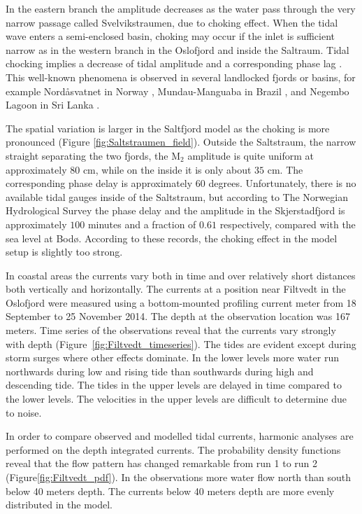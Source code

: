 In the eastern branch the amplitude decreases as the water pass through the very narrow passage called Svelvikstraumen, due to choking effect. 
When the tidal wave enters a semi-enclosed basin, choking may occur if the inlet is sufficient narrow as in the western branch in the Oslofjord and inside the Saltraum. Tidal chocking implies a decrease of tidal amplitude and a corresponding phase lag \cite[]{stigebrandt80}. This well-known phenomena is observed in several landlocked fjords or basins, for example Nord{\aa}svatnet in Norway \cite[]{glenne63}, Mundau-Manguaba in Brazil \cite[]{oliveira93}, and Negembo Lagoon in Sri Lanka \cite[]{rydberg96}. 

The spatial variation is larger in the Saltfjord model as the choking is more pronounced (Figure \ref{fig:Saltstraumen_field}). Outside the Saltstraum, the narrow straight separating the two fjords, the M$_2$ amplitude is quite uniform at approximately $80$ cm, while on the inside it is only about $35$ cm. The corresponding phase delay is approximately $60$ degrees. Unfortunately, there is no available tidal gauges inside of the Saltstraum, but according to The Norwegian Hydrological Survey the phase delay and the amplitude in the Skjerstadfjord is approximately $100$ minutes and a fraction of $0.61$ respectively, compared with the sea level at Bod{\o}.
According to these records, the choking effect in the model setup is slightly too strong.

In coastal areas the currents vary both in time and over relatively short distances both vertically and horizontally. The currents at a position near Filtvedt in the Oslofjord were measured using a bottom-mounted profiling current meter from 18 September to 25 November 2014. The depth at the observation location was 167 meters. Time series of the observations reveal that the currents vary strongly with depth (Figure~\ref{fig:Filtvedt_timeseries}). The tides are evident except during storm surges where other effects dominate. In the lower levels more water run northwards during low and rising tide than southwards during high and descending tide. The tides in the upper levels are delayed in time compared to the lower levels. The velocities in the upper levels are difficult to determine due to noise. 

In order to compare observed and modelled tidal currents, harmonic analyses are performed on the depth integrated currents. The  probability density functions reveal that the flow pattern has changed remarkable from run 1 to run 2 (Figure\-\ref{fig:Filtvedt_pdf}). In the observations more water flow north than south below 40 meters depth. The currents below 40 meters depth are more evenly distributed in the model.  

